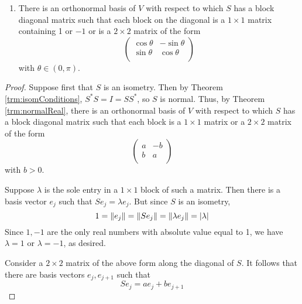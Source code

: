 \documentclass[../main.tex]{subfiles}
\begin{document}
\begin{itemize}
\begin{theorem}
\begin{enumerate}[label={\textup{(}\alph*\textup{)}}]
            \item There is an orthonormal basis of $V$ with respect to which $S$ has a block diagonal matrix such that each block on the diagonal is a $1\times 1$ matrix containing 1 or $-1$ or is a $2\times 2$ matrix of the form
            \begin{equation*}
                \begin{pmatrix}
                    \cos\theta & -\sin\theta\\
                    \sin\theta & \cos\theta\\
                \end{pmatrix}
            \end{equation*}
            with $\theta\in(0,\pi)$.
        \end{enumerate}
        \begin{proof}
            Suppose first that $S$ is an isometry. Then by Theorem \ref{trm:isomConditions}, $S^*S=I=SS^*$, so $S$ is normal. Thus, by Theorem \ref{trm:normalReal}, there is an orthonormal basis of $V$ with respect to which $S$ has a block diagonal matrix such that each block is a $1\times 1$ matrix or a $2\times 2$ matrix of the form
            \begin{equation*}
                \begin{pmatrix}
                    a & -b\\
                    b & a\\
                \end{pmatrix}
            \end{equation*}
            with $b>0$.\par
            Suppose $\lambda$ is the sole entry in a $1\times 1$ block of such a matrix. Then there is a basis vector $e_j$ such that $Se_j=\lambda e_j$. But since $S$ is an isometry,
            \begin{equation*}
                1 = \norm{e_j} = \norm{Se_j} = \norm{\lambda e_j} = |\lambda|
            \end{equation*}
            Since $1,-1$ are the only real numbers with absolute value equal to 1, we have $\lambda=1$ or $\lambda=-1$, as desired.\par
            Consider a $2\times 2$ matrix of the above form along the diagonal of $S$. It follows that there are basis vectors $e_j,e_{j+1}$ such that
            \begin{equation*}
                Se_j = ae_j+be_{j+1}
            \end{equation*}

\end{proof}
\end{theorem}
\end{itemize}
\end{document}
